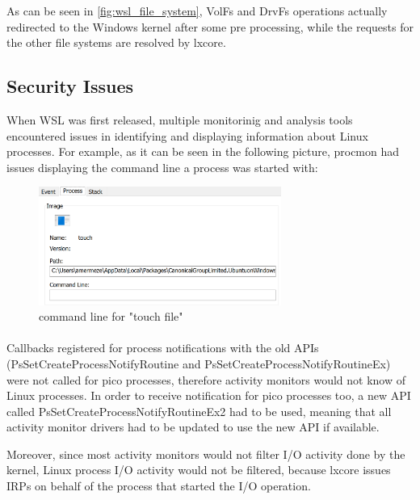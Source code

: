             As can be seen in \ref{fig:wsl_file_system}, VolFs and DrvFs operations actually redirected to the Windows kernel after some
            pre processing, while the requests for the other file systems are resolved by lxcore.
        
        \subsection{Security Issues}
            When WSL was first released, multiple monitorinig and analysis tools encountered issues in identifying and displaying information
            about Linux processes. For example, as it can be seen in the following picture, procmon had issues displaying the command line a
            process was started with:

            \begin{figure}[!htp]
                \centering
                \includegraphics[width=300px, keepaspectratio]{img/procmon.png}
                \caption{command line for "touch file"}
                \label{fig:procmon}
            \end{figure}

            \paragraph{}
            Callbacks registered for process notifications with the old APIs (PsSetCreateProcessNotifyRoutine and
            PsSetCreateProcessNotifyRoutineEx) were not called for pico processes, therefore activity monitors would not know of Linux processes.
            In order to receive notification for pico processes too, a new API called PsSetCreateProcessNotifyRoutineEx2 had to be used, meaning
            that all activity monitor drivers had to be updated to use the new API if available.

            Moreover, since most activity monitors would not filter I/O activity done by the kernel, Linux process I/O activity would not be
            filtered, because lxcore issues IRPs on behalf of the process that started the I/O operation.

